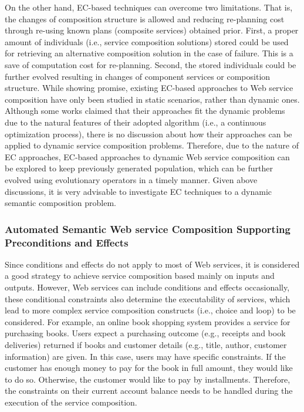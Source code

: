On the other hand, EC-based techniques can overcome two limitations. That is, the changes of composition structure is allowed and reducing re-planning cost through re-using known plans (composite services) obtained prior. First, a proper amount of individuals (i.e., service composition solutions) stored could be used for retrieving an alternative composition solution in the case of failure. This is a save of computation cost for re-planning. Second, the stored individuals could be further evolved resulting in changes of component services or composition structure. While showing promise, existing EC-based approaches to Web service composition have only been studied in static scenarios, rather than dynamic ones. Although some works \cite{feng2013dynamic,liu2005dynamic} claimed that their approaches fit the dynamic problems due to the natural features of their adopted algorithm (i.e., a continuous optimization process), there is no discussion about how their approaches can be applied to dynamic service composition problems. Therefore, due to the nature of EC approaches, EC-based approaches to dynamic Web service composition can be explored to keep previously generated population, which can be further evolved using evolutionary operators in a timely manner. Given above discussions, it is very advisable to investigate EC techniques to a dynamic semantic composition problem.


\subsubsection{Automated Semantic Web service Composition Supporting Preconditions and Effects}

Since conditions and effects do not apply to most of Web services, it is considered a good strategy to achieve service composition based mainly on inputs and outputs. However, Web services can include conditions and effects occasionally, these conditional constraints also determine the executability of services, which lead to more complex service composition constructs (i.e., choice and loop) to be considered. For example, an online book shopping system \cite{wang2014automated} provides a service for purchasing books. Users expect a purchasing outcome (e.g., receipts and book deliveries) returned if books and customer details (e.g., title, author, customer information) are given. In this case, users may have specific constraints. If the customer has enough money to pay for the book in full amount, they would like to do so. Otherwise, the customer would like to pay by installments. Therefore, the constraints on their current account balance needs to be handled during the execution of the service composition.

